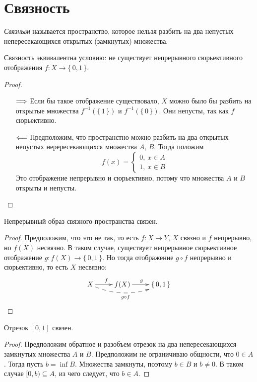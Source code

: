 \section{Связность}

\begin{definition}
	\textit{Связным} называется пространство, которое нельзя разбить на два
	непустых непересекающихся открытых (замкнутых) множества.
\end{definition}

\begin{remark}
	Связность эквивалентна условию: не существует непрерывного сюрьективного отображения
	$f \colon X \to \{\,0, 1\,\}$.
\end{remark}
\begin{proof}
	\enewline
	\begin{itemize}
		\item[$\Longrightarrow$] Если бы такое отображение существовало,
			$X$ можно было бы разбить на открытые множества $f^{-1}(\{\,1\,\})$
			и $f^{-1}(\{\,0\,\})$. Они непусты, так как $f$ сюрьективно.
		\item[$\Longleftarrow$] Предположим, что пространстно можно разбить на два
			открытых непустых нерересекающихся множества $A$, $B$. Тогда положим
\[
	f(x) = \begin{cases}
		0,~ x \in A \\
		1,~ x \in B
	\end{cases}
\]
			Это отображение непрерывно и сюрьективно, потому что множества $A$ и $B$
			открыты и непусты.
	\end{itemize}
\end{proof}

\begin{theorem}
	Непрерывный образ связного пространства связен.
\end{theorem}
\begin{proof}
	Предположим, что это не так, то есть $f \colon X \to Y$, $X$ связно и $f$ непрерывно,
	но $f(X)$ несвязно. В таком случае, существует непрерывное сюрьективное отображение
	$g \colon f(X) \to \{\,0, 1\,\}$. Но тогда отображение $g \circ f$ непрерывно
	и сюрьективно, то есть $X$ несвязно:
\[
	\xymatrix{
		X \ar[r]^{f} \ar@/_1pc/@{-->}[rr]_{g \circ f} & f(X) \ar[r]^{g} & \{\,0, 1\,\}
	}
\]
\end{proof}

\begin{theorem}
	Отрезок $[0, 1]$ связен.
\end{theorem}
\begin{proof}
	Предположим обратное и разобъем отрезок на два непересекающихся замкнутых
	множества $A$ и $B$. Предположим не ограничиваю общности, что $0 \in A$.
	Тогда пусть $b = \inf{B}$. Множества замкнуты, поэтому $b \in B$ и $b \neq 0$.
	В таком случае $[0, b) \subseteq A$, из чего следует, что $b \in A$.
\end{proof}

